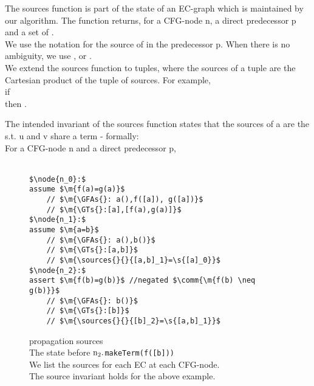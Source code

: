 \noindent
The sources function is part of the state of an EC-graph which is maintained by our algorithm. The function returns, for a CFG-node n, a direct predecessor p and \GT{}  a set of \GTs{}.\\
We use the notation  for the source of  in the predecessor p.
When there is no ambiguity, we use ,  or .\\
We extend the sources function to tuples, where the sources of a tuple are the Cartesian product of the tuple of sources.
For example,\\
if \m{\sources{}{}{[a,b]}=\s{[a],[b]}} \\
then \m{\sources{}{}{([a,b],[a,b])}=\s{([a],[a]),([a],[b])([b],[a])([b],[b])}}.

\noindent
The intended invariant of the sources function states that the sources of a \GT{}  are the \GTs{}  s.t. u and v share a term - formally:\\
For a CFG-node n and a direct predecessor p,\\
\\



%

\begin{figure}
\begin{lstlisting}
$\node{n_0}:$
assume $\m{f(a)=g(a)}$
	// $\m{\GFAs{}: a(),f([a]), g([a])}$
	// $\m{\GTs{}:[a],[f(a),g(a)]}$
$\node{n_1}:$
assume $\m{a=b}$
	// $\m{\GFAs{}: a(),b()}$
	// $\m{\GTs{}:[a,b]}$
	// $\m{\sources{}{}{[a,b]_1}=\s{[a]_0}}$
$\node{n_2}:$
assert $\m{f(b)=g(b)}$ //negated $\comm{\m{f(b) \neq g(b)}}$
	// $\m{\GFAs{}: b()}$
	// $\m{\GTs{}:[b]}$
	// $\m{\sources{}{}{[b]_2}=\s{[a,b]_1}}$
\end{lstlisting}
\caption{propagation sources\\
The state before $\mathrm{n_2.}$\lstinline|makeTerm(f([b]))|\\
We list the sources for each EC at each CFG-node.\\
The source invariant holds for the above example.
}
\label{snippet3.16b}
\end{figure}

